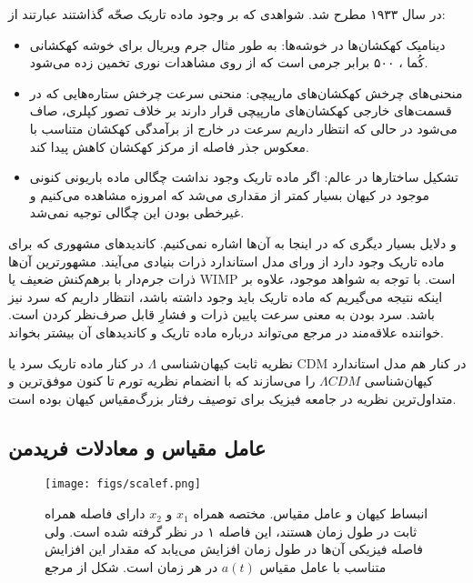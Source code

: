 در سال ۱۹۳۳ مطرح شد.
شواهدی که بر وجود ماده تاریک صحّه ‌گذاشتند عبارتند از:
\begin{itemize}
	\item 
	دینامیک کهکشان‌ها در خوشه‌ها: به طور مثال جرم ویریال برای خوشه کهکشانی کُما
	، ۵۰۰ برابر جرمی است که از روی مشاهدات نوری تخمین زده می‌شود.
	\cite{zwicky1933rotverschiebung}
	
	\item
	منحنی‌های چرخش کهکشان‌های مارپیچی: منحنی سرعت چرخش ستاره‌هایی که در قسمت‌های خارجی کهکشان‌های مارپیچی قرار دارند بر خلاف تصور کپلری، صاف می‌شود در حالی که انتظار داریم سرعت در خارج از برآمدگی کهکشان متناسب با معکوس جذر فاصله از مرکز کهکشان کاهش پیدا کند.    
	\cite{sofue1999central , sofue2001rotation}
 	\item
 	تشکیل ساختارها در عالم: اگر ماده تاریک وجود نداشت چگالی ماده باریونی کنونی موجود در کیهان بسیار کمتر از مقداری می‌شد که امروزه مشاهده می‌کنیم و غیرخطی بودن این چگالی توجیه نمی‌شد.
 	
\end{itemize}
و دلایل بسیار دیگری که در اینجا به آن‌ها اشاره نمی‌کنیم. کاندیدهای مشهوری که برای ماده تاریک وجود دارد از ورای مدل استاندارد ذرات بنیادی می‌آیند. مشهورترین آن‌ها ذرات جرم‌دار با برهم‌کنش ضعیف
یا WIMP است.
\cite{pospelov2008secluded}
با توجه به شواهد موجود، علاوه بر اینکه نتیجه می‌گیریم که ماده تاریک باید وجود داشته باشد، انتظار داریم که سرد نیز باشد. سرد بودن به معنی سرعت پایین ذرات و فشارِ قابل صرف‌نظر کردن است. خواننده علاقه‌مند در مرجع 
\cite{bertone2018history}
می‌تواند درباره ماده تاریک و کاندیدهای آن بیشتر بخواند.
\par
نظریه ثابت کیهان‌شناسی $\Lambda$ در کنار ماده تاریک سرد یا CDM در کنار هم مدل استاندارد کیهان‌شناسی 
$\Lambda CDM$
را می‌سازند که با انضمام نظریه تورم
تا کنون موفق‌ترین و متداول‌ترین نظریه در جامعه فیزیک برای توصیف رفتار بزرگ‌مقیاس کیهان بوده است.
 
\subsection{عامل مقیاس و معادلات فریدمن}
\label{subsec:scale_factor}

\begin{figure}
	\begin{center}
		\texttt{[image: figs/scalef.png]}
	\end{center}
	\caption[
	انبساط کیهان و عامل مقیاس. مختصه همراه $x_1$ و $x_2$  دارای فاصله همراه ثابت در طول زمان هستند، این فاصله ۱ در نظر گرفته شده است. ولی فاصله فیزیکی آن‌ها در طول زمان افزایش می‌یابد که مقدار این افزایش متناسب با عامل مقیاس 
	$a(t)$ 
	در هر زمان است. شکل از مرجع 
	\cite{dodelson2020modern}]
	{ 
		انبساط کیهان و عامل مقیاس. مختصه همراه $x_1$ و $x_2$ دارای فاصله همراه ثابت در طول زمان هستند، این فاصله ۱ در نظر گرفته شده است. ولی فاصله فیزیکی آن‌ها در طول زمان افزایش می‌یابد که مقدار این افزایش متناسب با عامل مقیاس
		$a(t)$ 
		در هر زمان است. شکل از مرجع  
		\cite{dodelson2020modern}
	}
	\label{fig:scalef}
\end{figure}

